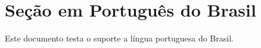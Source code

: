 \documentclass{article}
\begin{document}
\section{Seção em Português do Brasil}
Este documento testa o suporte a língua portuguesa do Brasil.
\tableofcontents
\end{document}
